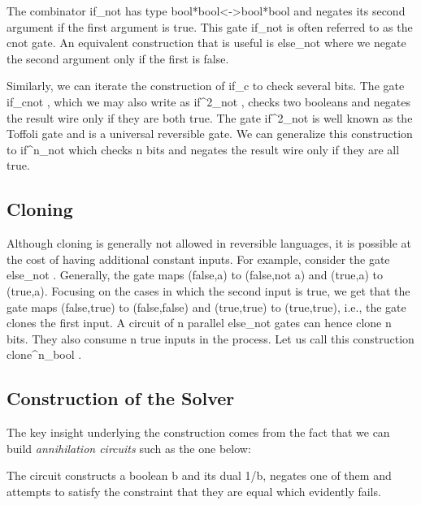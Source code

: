\documentclass[preprint]{sigplanconf}
\begin{document}
The combinator {{if_{not} }} has type {{bool*bool<->bool*bool}} and
negates its second argument if the first argument is {{true}}. This
gate {{if_{not} }} is often referred to as the {{cnot}} gate. An
equivalent construction that is useful is {{else_{not} }} where we
negate the second argument only if the first is {{false}}. 

Similarly, we can iterate the construction of {{if_c}} to check several
bits. The gate {{if_{cnot} }}, which we may also write as {{if^2_{not} }},
checks two booleans and negates the result wire only if they are both
{{true}}. The gate {{if^2_{not} }} is well known as the Toffoli gate and is a
universal reversible gate. We can generalize this construction to
{{if^n_{not} }} which checks {{n}} bits and negates the result wire only if
they are all {{true}}.

\subsection{Cloning}

Although cloning is generally not allowed in reversible languages, it is
possible at the cost of having additional constant inputs. For example,
consider the gate {{else_{not} }}. Generally, the gate maps
{{(false,a)}} to {{(false,not a)}} and {{(true,a)}} to {{(true,a)}}. Focusing
on the cases in which the second input is {{true}}, we get that the gate maps
{{(false,true)}} to {{(false,false)}} and {{(true,true)}} to {{(true,true)}},
i.e., the gate clones the first input. A circuit of {{n}} parallel
{{else_{not} }} gates can hence clone {{n}} bits.  They also consume {{n}}
{{true}} inputs in the process.  Let us call this construction
{{clone^n_{bool} }}.

\subsection{Construction of the Solver}

The key insight underlying the construction comes from the fact that we can
build \emph{annihilation circuits} such as the one below:

\begin{center}
\end{center}
The circuit constructs a boolean {{b}} and its dual {{1/b}}, negates one of
them and attempts to satisfy the constraint that they are equal which
evidently fails. 
\end{document}
